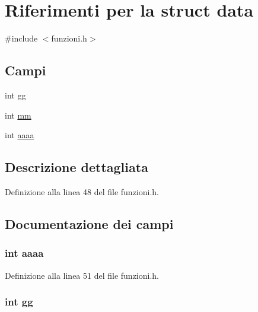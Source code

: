 \hypertarget{structdata}{\section{Riferimenti per la struct data}
\label{structdata}
}


{\ttfamily \#include $<$funzioni.\+h$>$}

\subsection*{Campi}
\begin{DoxyCompactItemize}
\item 
int \hyperlink{structdata_a90a840dc2cad65d1e73a074141fdacf4}{gg}
\item 
int \hyperlink{structdata_a34c26acca324499b464752be283dc36f}{mm}
\item 
int \hyperlink{structdata_a501ac5edfbac6ff554bed378ef2d91d8}{aaaa}
\end{DoxyCompactItemize}


\subsection{Descrizione dettagliata}


Definizione alla linea 48 del file funzioni.\+h.



\subsection{Documentazione dei campi}
\hypertarget{structdata_a501ac5edfbac6ff554bed378ef2d91d8}{
\subsubsection[{aaaa}]{\setlength{\rightskip}{0pt plus 5cm}int aaaa}}\label{structdata_a501ac5edfbac6ff554bed378ef2d91d8}


Definizione alla linea 51 del file funzioni.\+h.

\hypertarget{structdata_a90a840dc2cad65d1e73a074141fdacf4}{
\subsubsection[{gg}]{\setlength{\rightskip}{0pt plus 5cm}int gg}}\label{structdata_a90a840dc2cad65d1e73a074141fdacf4}



